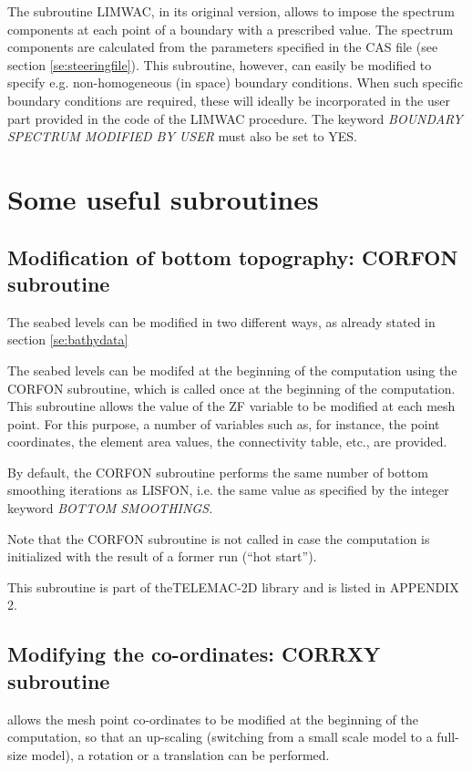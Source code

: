  The subroutine LIMWAC, in its original version, allows to impose the spectrum components at each point of a boundary with a prescribed value. The spectrum components are calculated from the parameters specified in the CAS file (see section \ref{se:steeringfile}). This subroutine, however, can easily be modified to specify e.g. non-homogeneous (in space) boundary conditions. When such specific boundary conditions are required, these will ideally be incorporated in the user part provided in the code of the LIMWAC procedure. The keyword \textit{BOUNDARY SPECTRUM MODIFIED BY USER} must also be set to YES.


\section{ Some useful subroutines}


\subsection{ Modification of bottom topography: CORFON subroutine}
\label{se:corfon}
 The seabed levels can be modified in two different ways, as already stated in section \ref{se:bathydata}

 The seabed levels can be modifed at the beginning of the computation using the CORFON subroutine, which is called once at the beginning of the computation. This subroutine allows the value of the ZF variable to be modified at each mesh point. For this purpose, a number of variables such as, for instance, the point coordinates, the element area values, the connectivity table, etc., are provided.

 By default, the CORFON subroutine performs the same number of bottom smoothing iterations as LISFON, i.e. the same value as specified by the integer keyword \textit{BOTTOM SMOOTHINGS.}

 Note that the CORFON subroutine is not called in case the computation is initialized with the result of a former \tomawac run (``hot start'').

 This subroutine is part of theTELEMAC-2D library and is listed in APPENDIX 2.


\subsection{ Modifying the co-ordinates: CORRXY subroutine }

 \tomawac allows the mesh point co-ordinates to be modified at the beginning of the computation, so that an up-scaling (switching from a small scale model to a full-size model), a rotation or a translation can be performed.


